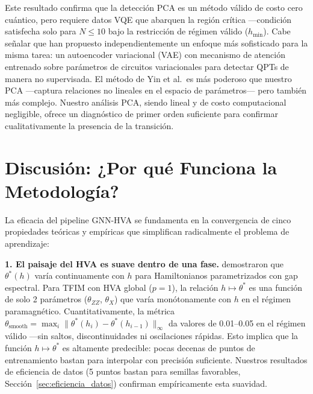 \documentclass[11pt,a4paper,spanish]{book}
\begin{document}
Este resultado confirma que la detección PCA es un método válido de costo cero cuántico, pero requiere datos VQE que abarquen la región crítica ---condición satisfecha solo para $N \leq 10$ bajo la restricción de régimen válido ($h_{\min}$). Cabe señalar que \citet{yin2025} han propuesto independientemente un enfoque más sofisticado para la misma tarea: un autoencoder variacional (VAE) con mecanismo de atención entrenado sobre parámetros de circuitos variacionales para detectar QPTs de manera no supervisada. El método de Yin et al.\ es más poderoso que nuestro PCA ---captura relaciones no lineales en el espacio de parámetros--- pero también más complejo. Nuestro análisis PCA, siendo lineal y de costo computacional negligible, ofrece un diagnóstico de primer orden suficiente para confirmar cualitativamente la presencia de la transición.

\section{Discusión: ¿Por qué Funciona la Metodología?}

La eficacia del pipeline GNN-HVA se fundamenta en la convergencia de cinco propiedades teóricas y empíricas que simplifican radicalmente el problema de aprendizaje:

\textbf{1. El paisaje del HVA es suave dentro de una fase.} \citet{mele2022} demostraron que $\theta^*(h)$ varía continuamente con $h$ para Hamiltonianos parametrizados con gap espectral. Para TFIM con HVA global ($p = 1$), la relación $h \mapsto \theta^*$ es una función de solo 2 parámetros ($\theta_{ZZ}$, $\theta_X$) que varía monótonamente con $h$ en el régimen paramagnético. Cuantitativamente, la métrica $\theta_{\text{smooth}} = \max_i \|\theta^*(h_i) - \theta^*(h_{i-1})\|_\infty$ da valores de 0.01--0.05 en el régimen válido ---sin saltos, discontinuidades ni oscilaciones rápidas. Esto implica que la función $h \mapsto \theta^*$ es altamente predecible: pocas decenas de puntos de entrenamiento bastan para interpolar con precisión suficiente. Nuestros resultados de eficiencia de datos (5 puntos bastan para semillas favorables, Sección~\ref{sec:eficiencia_datos}) confirman empíricamente esta suavidad.
\end{document}
